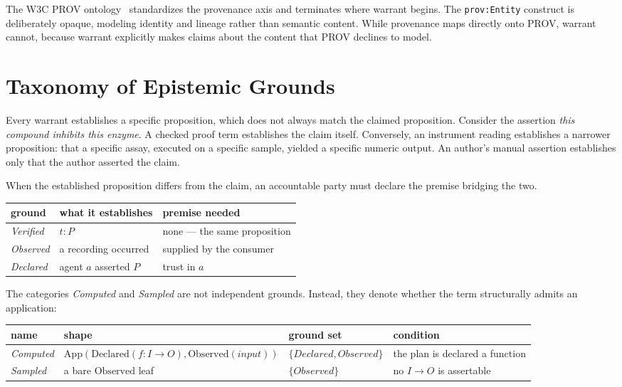 \documentclass[manuscript,nonacm=true]{acmart}
\newcommand{\code}[1]{\texttt{\small #1}}
\begin{document}
The W3C PROV ontology~\cite{provo} standardizes the provenance axis and terminates where warrant begins. The \code{prov:Entity} construct is deliberately opaque, modeling identity and lineage rather than semantic content. While provenance maps directly onto PROV, warrant cannot, because warrant explicitly makes claims about the content that PROV declines to model.

\section{Taxonomy of Epistemic Grounds}

Every warrant establishes a specific proposition, which does not always match the claimed proposition. Consider the assertion \emph{this compound inhibits this enzyme}. A checked proof term establishes the claim itself. Conversely, an instrument reading establishes a narrower proposition: that a specific assay, executed on a specific sample, yielded a specific numeric output. An author's manual assertion establishes only that the author asserted the claim.

When the established proposition differs from the claim, an accountable party must declare the premise bridging the two.

\begin{table}[h]
\small
\begin{tabular}{@{}lll@{}}
\toprule
\textbf{ground} & \textbf{what it establishes} & \textbf{premise needed} \\
\midrule
\emph{Verified} & $t : P$ & none --- the same proposition \\
\emph{Observed} & a recording occurred & supplied by the consumer \\
\emph{Declared} & agent $a$ asserted $P$ & trust in $a$ \\
\bottomrule
\end{tabular}
\end{table}

The categories \emph{Computed} and \emph{Sampled} are not independent grounds. Instead, they denote whether the term structurally admits an application:

\begin{table}[h]
\small
\begin{tabular}{@{}llll@{}}
\toprule
\textbf{name} & \textbf{shape} & \textbf{ground set} & \textbf{condition} \\
\midrule
\emph{Computed} & $\mathrm{App}(\mathrm{Declared}(f : I \to O), \mathrm{Observed}(\mathit{input}))$ & $\{\mathit{Declared}, \mathit{Observed}\}$ & the plan is declared a function \\
\emph{Sampled} & a bare $\mathrm{Observed}$ leaf & $\{\mathit{Observed}\}$ & no $I \to O$ is assertable \\
\bottomrule
\end{tabular}
\end{table}
\end{document}
